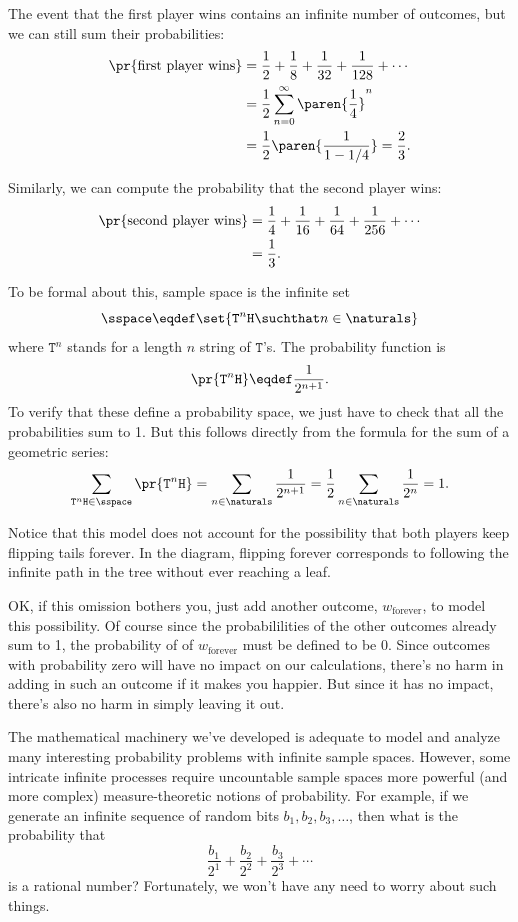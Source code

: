 The event that the first player wins contains an infinite number of
outcomes, but we can still sum their probabilities:
\begin{align*}
\pr{\text{first player wins}}
    & = \frac{1}{2} + \frac{1}{8} + \frac{1}{32} + \frac{1}{128} + \cdots \\
    & = \frac{1}{2} \sum_{n=0}^\infty \paren{\frac{1}{4}}^n \\
    & = \frac{1}{2}\paren{\frac{1}{1-1/4}} = \frac{2}{3}.
\end{align*}

Similarly, we can compute the probability that the second player wins:
\begin{align*}
\pr{\text{second player wins}}
    & = \frac{1}{4} + \frac{1}{16} + \frac{1}{64} + \frac{1}{256}
                      + \cdots \\
    & = \frac{1}{3}.
\end{align*}

To be formal about this, sample space is the infinite set
\[
\sspace \eqdef \set{\mathtt{T}^n\mathtt{H} \suchthat n \in \naturals}
\]
where $\mathtt{T}^n$ stands for a length $n$ string of $\mathtt{T}$'s.
The probability function is
\[
\pr{\mathtt{T}^n\mathtt{H}} \eqdef \frac{1}{2^{n+1}}.
\]
To verify that these define a probability space, we just have to check
that all the probabilities sum to 1.  But this follows directly from the
formula for the sum of a geometric series:
\[
\sum_{\mathtt{T}^n\mathtt{H} \in \sspace} \pr{\mathtt{T}^n\mathtt{H}} =
\sum_{n \in \naturals} \frac{1}{2^{n+1}} = \frac{1}{2}\sum_{n \in
  \naturals} \frac{1}{2^n} = 1.
\]

Notice that this model does not account for the possibility that both
players keep flipping tails forever.  In the diagram, flipping forever
corresponds to following the infinite path in the tree without ever
reaching a leaf.

OK, if this omission bothers you, just add another outcome,
$w_{\text{forever}}$, to model this possibility.  Of course since the
probabililities of the other outcomes already sum to 1, the probability of
of $w_{\text{forever}}$ must be defined to be 0.  Since outcomes with
probability zero will have no impact on our calculations, there's no harm
in adding in such an outcome if it makes you happier.  But since it has no
impact, there's also no harm in simply leaving it out.

The mathematical machinery we've developed is adequate to model and
analyze many interesting probability problems with infinite sample spaces.
However, some intricate infinite processes require uncountable sample
spaces more powerful (and more complex) measure-theoretic notions of
probability.  For example, if we generate an infinite sequence of random
bits $b_1, b_2, b_3, \ldots$, then what is the probability that
\[
\frac{b_1}{2^1} + \frac{b_2}{2^2} + \frac{b_3}{2^3} + \cdots
\]
is a rational number?  Fortunately, we won't have any need to worry about
such things.


